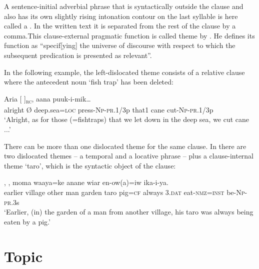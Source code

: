 A sentence-initial adverbial phrase that is syntactically outside the clause and also has its own slightly rising intonation contour on the last syllable is here called a . In the written text it is separated from the rest of the clause by a comma.This clause-external pragmatic function is called theme by \citet[19]{Dik1978}. He defines its function as ``specif[ying] the universe of discourse with respect to which the subsequent predication is presented as relevant''.

 In the following example, the left-dislocated theme consists of a relative clause where the antecedent noun  `fish trap' has been deleted:

\ea%
\label{ex:x1704}
\gll Aria  [\textstyleEmphasizedVernacularWords{{\O}}    ]\textsubscript{\textsc{rc}}, aana puuk-i-mik{\dots}\\
alright {\O} deep.sea=\textsc{loc} press-\textsc{Np}-\textsc{pr}.1/3p that1 cane cut-\textsc{Np}-\textsc{pr}.1/3p\\
\glt`Alright, as for those (=fishtraps) that we let down in the deep sea, we cut cane ...'
\z


There can be more than one dislocated theme for the same clause. In  there are two dislocated themes -- a temporal and a locative phrase -- plus a clause-internal theme  `taro', which is the syntactic object of the clause:

\ea%
\label{ex:x1700}
\gll {},      , moma  waaya=ke  anane  wiar  en-ow(a)=iw  ika-i-ya.\\
earlier  village  other  man  garden  taro pig=\textsc{cf}  always  3.\textsc{dat}  eat-\textsc{nmz}=\textsc{inst}  be-\textsc{Np}-\textsc{pr}.3s      \\
\glt`Earlier, (in) the garden of a man from another village, his taro was always being eaten by a pig.'
\z


\section{Topic} 

